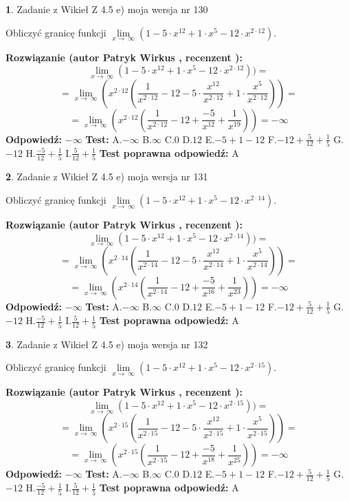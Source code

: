 \documentclass[12pt, a4paper]{article}
\theoremstyle{definition} %
\newtheorem{zad}{}
\newcommand{\zadStart}[1]{\begin{zad}#1\newline}
\newcommand{\zadStop}{\end{zad}}
\newcommand{\rozwStart}[2]{\noindent \textbf{Rozwiązanie (autor #1 , recenzent #2): }\newline}
\newcommand{\rozwStop}{\newline}
\newcommand{\odpStart}{\noindent \textbf{Odpowiedź:}\newline}
\newcommand{\odpStop}{\newline}
\newcommand{\testStart}{\noindent \textbf{Test:}\newline}
\newcommand{\testStop}{\newline}
\newcommand{\kluczStart}{\noindent \textbf{Test poprawna odpowiedź:}\newline}
\newcommand{\kluczStop}{\newline}
\begin{document}
\zadStart{Zadanie z Wikieł Z 4.5 e) moja wersja nr 130}



Obliczyć granicę funkcji  $\lim\limits_{x\to\ \infty}(1 - 5 \cdot x^{12}+1 \cdot x^{5}- 12 \cdot x^{2\cdot12})$.
\zadStop
\rozwStart{Patryk Wirkus}{}
$$\lim\limits_{x\to\ \infty}(1 - 5 \cdot x^{12}+1 \cdot x^{5}- 12 \cdot x^{2\cdot12}))=$$
$$=\lim\limits_{x\to\ \infty}(x^{2\cdot12}(\frac{1}{x^{2\cdot12}}-12 -5 \cdot \frac{x^{12}}{x^{2\cdot12}}+1 \cdot \frac{x^{5}}{x^{2\cdot12}}))=$$
$$=\lim\limits_{x\to\ \infty}(x^{2\cdot12}(\frac{1}{x^{2\cdot12}}-12 + \frac{-5}{x^{12}}+ \frac{1}{x^{19}}))=-\infty$$
\rozwStop
\odpStart
$-\infty$
\odpStop
\testStart
A.$-\infty$ B.$\infty$ C.$0$ D.$12$ E.$-5 + 1 - 12$
F.$-12+\frac{5}{12}+\frac{1}{5}$ G.$-12$
H.$\frac{-5}{12}+\frac{1}{5}$
I.$\frac{5}{12}+\frac{1}{5}$
\testStop
\kluczStart
A
\kluczStop



\zadStart{Zadanie z Wikieł Z 4.5 e) moja wersja nr 131}



Obliczyć granicę funkcji  $\lim\limits_{x\to\ \infty}(1 - 5 \cdot x^{12}+1 \cdot x^{5}- 12 \cdot x^{2\cdot14})$.
\zadStop
\rozwStart{Patryk Wirkus}{}
$$\lim\limits_{x\to\ \infty}(1 - 5 \cdot x^{12}+1 \cdot x^{5}- 12 \cdot x^{2\cdot14}))=$$
$$=\lim\limits_{x\to\ \infty}(x^{2\cdot14}(\frac{1}{x^{2\cdot14}}-12 -5 \cdot \frac{x^{12}}{x^{2\cdot14}}+1 \cdot \frac{x^{5}}{x^{2\cdot14}}))=$$
$$=\lim\limits_{x\to\ \infty}(x^{2\cdot14}(\frac{1}{x^{2\cdot14}}-12 + \frac{-5}{x^{16}}+ \frac{1}{x^{23}}))=-\infty$$
\rozwStop
\odpStart
$-\infty$
\odpStop
\testStart
A.$-\infty$ B.$\infty$ C.$0$ D.$12$ E.$-5 + 1 - 12$
F.$-12+\frac{5}{12}+\frac{1}{5}$ G.$-12$
H.$\frac{-5}{12}+\frac{1}{5}$
I.$\frac{5}{12}+\frac{1}{5}$
\testStop
\kluczStart
A
\kluczStop



\zadStart{Zadanie z Wikieł Z 4.5 e) moja wersja nr 132}



Obliczyć granicę funkcji  $\lim\limits_{x\to\ \infty}(1 - 5 \cdot x^{12}+1 \cdot x^{5}- 12 \cdot x^{2\cdot15})$.
\zadStop
\rozwStart{Patryk Wirkus}{}
$$\lim\limits_{x\to\ \infty}(1 - 5 \cdot x^{12}+1 \cdot x^{5}- 12 \cdot x^{2\cdot15}))=$$
$$=\lim\limits_{x\to\ \infty}(x^{2\cdot15}(\frac{1}{x^{2\cdot15}}-12 -5 \cdot \frac{x^{12}}{x^{2\cdot15}}+1 \cdot \frac{x^{5}}{x^{2\cdot15}}))=$$
$$=\lim\limits_{x\to\ \infty}(x^{2\cdot15}(\frac{1}{x^{2\cdot15}}-12 + \frac{-5}{x^{18}}+ \frac{1}{x^{25}}))=-\infty$$
\rozwStop
\odpStart
$-\infty$
\odpStop
\testStart
A.$-\infty$ B.$\infty$ C.$0$ D.$12$ E.$-5 + 1 - 12$
F.$-12+\frac{5}{12}+\frac{1}{5}$ G.$-12$
H.$\frac{-5}{12}+\frac{1}{5}$
I.$\frac{5}{12}+\frac{1}{5}$
\testStop
\kluczStart
A
\kluczStop
\end{document}
